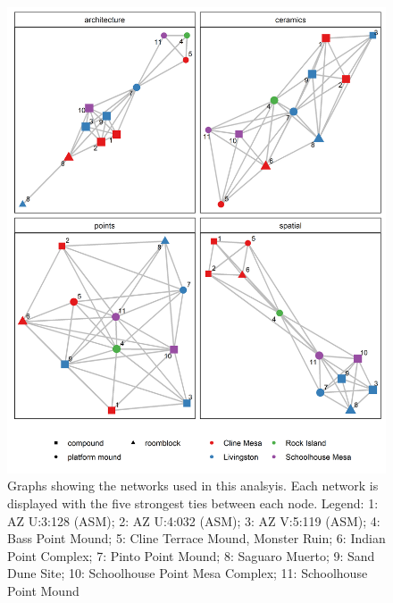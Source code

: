 \documentclass[]{interact}
\theoremstyle{plain}%
\theoremstyle{definition}
\theoremstyle{remark}
\begin{document}
\begin{figure}
\includegraphics[width=1\linewidth]{figures/TontoNetworksMultiNet} \caption{Graphs showing the networks used in this analsyis. Each network is displayed with the five strongest ties between each node. Legend: 1: AZ U:3:128 (ASM); 2: AZ U:4:032 (ASM); 3: AZ V:5:119 (ASM); 4: Bass Point Mound; 5: Cline Terrace Mound, Monster Ruin; 6: Indian Point Complex; 7: Pinto Point Mound; 8: Saguaro Muerto; 9: Sand Dune Site; 10: Schoolhouse Point Mesa Complex; 11: Schoolhouse Point Mound}\label{fig:TontoNetworksMultiNet}
\end{figure}
\end{document}
